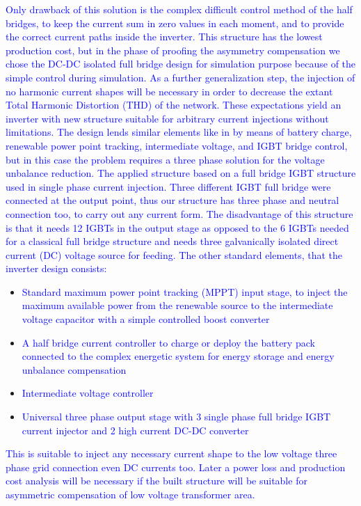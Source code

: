     \textcolor{blue}{
        Only drawback of this solution is the complex difficult control method of the half bridges, to keep the current sum in zero values in each moment, and to provide the correct current paths inside the inverter. This structure has the lowest production cost, but in the phase of proofing the asymmetry compensation we chose the DC-DC isolated  full bridge design for simulation purpose because of the simple control during simulation.}
    \textcolor{blue}{
        As a further generalization step, the injection of no harmonic current shapes will be necessary in order to decrease the extant Total Harmonic Distortion (THD) of the network. These expectations yield an inverter with new structure suitable for arbitrary current injections without limitations. The design lends similar elements like in \cite{gorbe2012reduction} by means of battery charge, renewable power point tracking, intermediate voltage, and IGBT bridge control, but in this case the problem requires a three phase solution for the voltage unbalance reduction. The applied structure based on a full bridge IGBT structure used in single phase current injection. Three different IGBT full bridge were connected at the output point, thus our structure has three phase and neutral connection too, to carry out any current form. The disadvantage of this structure is that it needs 12 IGBTs in the output stage as opposed to the 6 IGBTs needed for a classical full bridge structure and needs three galvanically isolated direct current (DC) voltage source for feeding.}
    \textcolor{blue}{The other standard elements, that the inverter design consists:}



        \begin{itemize}
            \item\textcolor{blue}{ Standard maximum power point tracking (MPPT) input stage, to inject the maximum available power from the renewable source to the intermediate voltage capacitor with a simple controlled boost converter}
            \item\textcolor{blue}{ A half bridge current controller to charge or deploy the battery pack connected to the complex energetic system for energy storage and energy unbalance compensation}
            \item\textcolor{blue}{ Intermediate voltage controller}
            \item\textcolor{blue}{ Universal three phase output stage with 3 single phase full bridge IGBT current injector and 2 high current DC-DC converter}
        \end{itemize}
    \textcolor{blue}{
        This is suitable to inject any necessary current shape to the low voltage three phase grid connection even DC currents too. Later a power loss and production cost analysis will be necessary if the built structure will be suitable for asymmetric compensation of low voltage transformer area.}


